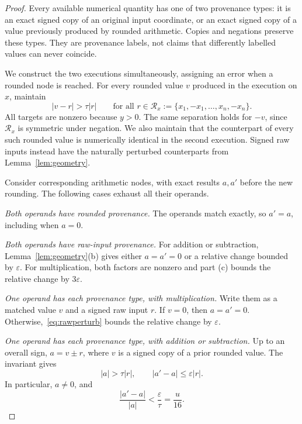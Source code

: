 \documentclass[11pt,a4paper]{article}
\numberwithin{equation}{section}
\theoremstyle{definition}
\theoremstyle{remark}
\newcommand{\abs}[1]{\left|#1\right|}
\begin{document}
\begin{proof}
Every available numerical quantity has one of two provenance types:
it is an exact signed copy of an original input coordinate, or an exact
signed copy of a value previously produced by rounded arithmetic.
Copies and negations preserve these types.  They are provenance labels,
not claims that differently labelled values can never coincide.

We construct the two executions simultaneously, assigning an error when
a rounded node is reached.  For every rounded value $v$ produced in the
execution on $x$, maintain
\begin{equation}\label{eq:invariant}
 \abs{v-r}>\tau\abs r
 \qquad\text{for all }r\in\mathcal R_x
 :=\{x_1,-x_1,\ldots,x_n,-x_n\}.
\end{equation}
All targets are nonzero because $y>0$.  The same separation holds for
$-v$, since $\mathcal R_x$ is symmetric under negation.  We also maintain
that the counterpart of every such rounded value is numerically identical
in the second execution.  Signed raw inputs instead have the naturally
perturbed counterparts from Lemma~\ref{lem:geometry}.

Consider corresponding arithmetic nodes, with exact results $a,a'$
before the new rounding.  The following cases exhaust all their operands.

\smallskip
\noindent\emph{Both operands have rounded provenance.}
The operands match exactly, so $a'=a$, including when $a=0$.

\smallskip
\noindent\emph{Both operands have raw-input provenance.}
For addition or subtraction, Lemma~\ref{lem:geometry}(b) gives either
$a=a'=0$ or a relative change bounded by $\varepsilon$.
For multiplication, both factors are nonzero and part (c) bounds the
relative change by $3\varepsilon$.

\smallskip
\noindent\emph{One operand has each provenance type, with multiplication.}
Write them as a matched value $v$ and a signed raw input $r$.
If $v=0$, then $a=a'=0$.  Otherwise,~\eqref{eq:rawperturb} bounds the
relative change by $\varepsilon$.

\smallskip
\noindent\emph{One operand has each provenance type, with addition or
subtraction.}
Up to an overall sign, $a=v\pm r$, where $v$ is a signed copy of a prior
rounded value.  The invariant gives
\[
 \abs a>\tau\abs r,
 \qquad
 \abs{a'-a}\le\varepsilon\abs r.
\]
In particular, $a\ne0$, and
\begin{equation}\label{eq:mixedchange}
 \frac{\abs{a'-a}}{\abs a}
 <\frac{\varepsilon}{\tau}=\frac u{16}.
\end{equation}


\end{proof}
\end{document}
